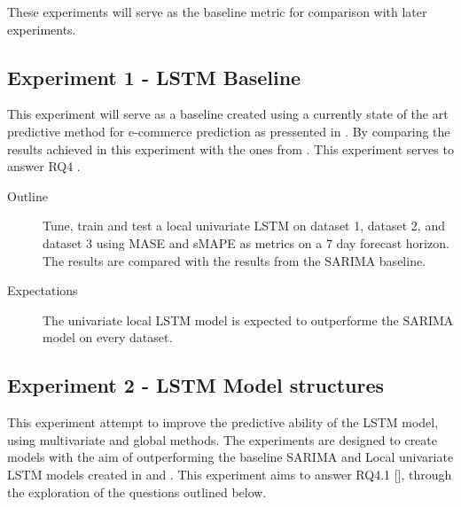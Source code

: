 These experiments will serve as the baseline metric for comparison with later experiments.




\subsection{Experiment 1 - LSTM Baseline}
\label{section:results:experimentPlan:Experiment-1}
This experiment will serve as a baseline created using a currently state of the art predictive method
for e-commerce prediction as pressented in .
By comparing the results achieved in this experiment with the ones from .
This experiment serves to answer RQ4 .

\begin{description}
  \item[Outline]{
              Tune, train and test a local univariate LSTM on dataset 1,
              dataset 2, and dataset 3 using MASE and sMAPE as metrics on a 7 day forecast horizon.
              The results are compared with the results from the SARIMA baseline. }
\end{description}

\begin{description}
  \item[Expectations]{
              The univariate local LSTM model is expected to outperforme the SARIMA model on every dataset.
        }
\end{description}




\subsection{Experiment 2 - LSTM Model structures}
\label{section:results:experimentPlan:Experiment-2}
This experiment attempt to improve the predictive ability of the LSTM model,
using multivariate and global methods.
The experiments are designed to create models with the aim of outperforming the baseline
SARIMA and Local univariate LSTM models created in  and .
This experiment aims to answer RQ4.1 [],
through the exploration of the questions outlined below.

